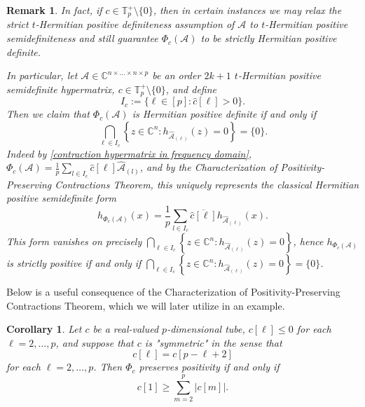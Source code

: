 \documentclass[11pt]{article}
\newtheorem{corollary}[theorem]{Corollary}
\newtheorem{remark}[theorem]{Remark}
\begin{document}
\begin{remark}
    In fact, if $c\in \mathbb{T}_p^+\setminus \{0\}$, then in certain instances we may relax the strict $t$-Hermitian positive definiteness assumption of $\mathcal{A}$ to $t$-Hermitian positive semidefiniteness and still guarantee $\Phi_c(\mathcal{A})$ to be strictly Hermitian positive definite. 

    In particular, let $\mathcal{A}\in \mathbb{C}^{n\times\dots\times n\times p}$ be an order $2k+1$ $t$-Hermitian positive semidefinite hypermatrix, $c\in \mathbb{T}_p^+\setminus \{0\}$, and define 
    \[I_c := \{\ell\in [p]:\widehat{c}[\ell]>0\}.\]
    Then we claim that $\Phi_c(\mathcal{A})$ is Hermitian positive definite if and only if 
    \[\bigcap\limits_{\ell\in I_c}\left\{z\in \mathbb{C}^n:h_{\widehat{\mathcal{A}}_{(\ell)}}(z)=0\right\} = \{0\}.\]
    Indeed by \eqref{contraction hypermatrix in frequency domain}, $\Phi_c(\mathcal{A}) = \frac{1}{p}\sum\limits_{l\in I_c}\widehat{c}[\ell]\widehat{\mathcal{A}}_{(l)}$, and by the Characterization of Positivity-Preserving Contractions Theorem, this uniquely represents the classical Hermitian positive semidefinite form
    \[h_{\Phi_c(\mathcal{A})}(x) = \frac{1}{p}\sum\limits_{l\in I_c}\overline{\widehat{c}[\ell]}h_{\widehat{\mathcal{A}}_{(\ell)}}(x).\]
    This form vanishes on precisely $\bigcap\limits_{\ell\in I_c}\left\{z\in \mathbb{C}^n:h_{\widehat{\mathcal{A}}_{(\ell)}}(z)=0\right\}$, hence $h_{\Phi_c(\mathcal{A})}$ is strictly positive if and only if $\bigcap\limits_{\ell\in I_c}\left\{z\in \mathbb{C}^n:h_{\widehat{\mathcal{A}}_{(\ell)}}(z)=0\right\} = \{0\}$.  
\end{remark}
Below is a useful consequence of the Characterization of Positivity-Preserving Contractions Theorem, which we will later utilize in an example. 
\begin{corollary}\label{Symmetric Tubes and Preserving Positivity}
    Let $c$ be a real-valued $p$-dimensional tube, $c[\ell]\leq 0$ for each $\ell=2,\dots,p$, and suppose that $c$ is "symmetric" in the sense that 
    \[c[\ell] = c[p-\ell+2]\]
    for each $\ell=2,\dots,p$. Then $\Phi_c$ preserves positivity if and only if 
    \[c[1] \geq \sum\limits_{m=2}^p\left|c[m]\right|.\]
\end{corollary}
\end{document}
